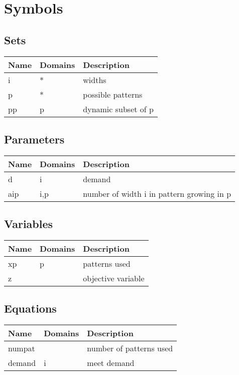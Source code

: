 \documentclass[11pt]{article}
\begin{document}
\section*{Symbols}


\subsection*{Sets}
\begin{tabularx}{\textwidth}{| l | l | X |}
\hline
\textbf{Name} & \textbf{Domains} & \textbf{Description}\\
\hline
\endhead

i & * & widths\\
p & * & possible patterns\\
pp & p & dynamic subset of p\\
\hline
\end{tabularx}
\subsection*{Parameters}
\begin{tabularx}{\textwidth}{| l | l | X |}
\hline
\textbf{Name} & \textbf{Domains} & \textbf{Description}\\
\hline
\endhead

d & i & demand\\
aip & i,p & number of width i in pattern growing in p\\
\hline
\end{tabularx}
\subsection*{Variables}
\begin{tabularx}{\textwidth}{| l | l | X |}
\hline
\textbf{Name} & \textbf{Domains} & \textbf{Description}\\
\hline
\endhead

xp & p & patterns used\\
z &  & objective variable\\
\hline
\end{tabularx}
\subsection*{Equations}
\begin{tabularx}{\textwidth}{| l | l | X |}
\hline
\textbf{Name} & \textbf{Domains} & \textbf{Description}\\
\hline
\endhead

numpat &  & number of patterns used\\
demand & i & meet demand\\
\hline
\end{tabularx}
\end{document}
